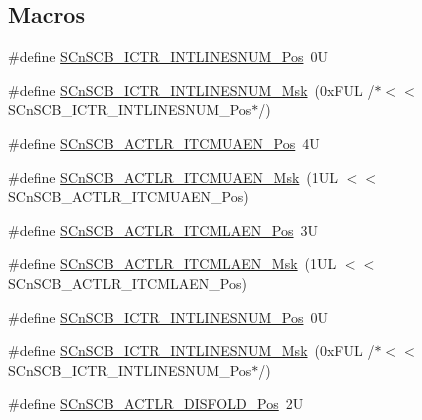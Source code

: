 \subsection*{Macros}
\begin{DoxyCompactItemize}
\item 
\#define \hyperlink{group___c_m_s_i_s___s_cn_s_c_b_ga0777ddf379af50f9ca41d40573bfffc5}{S\+Cn\+S\+C\+B\+\_\+\+I\+C\+T\+R\+\_\+\+I\+N\+T\+L\+I\+N\+E\+S\+N\+U\+M\+\_\+\+Pos}~0U
\item 
\#define \hyperlink{group___c_m_s_i_s___s_cn_s_c_b_ga3efa0f5210051464e1034b19fc7b33c7}{S\+Cn\+S\+C\+B\+\_\+\+I\+C\+T\+R\+\_\+\+I\+N\+T\+L\+I\+N\+E\+S\+N\+U\+M\+\_\+\+Msk}~(0x\+F\+U\+L /$\ast$$<$$<$ S\+Cn\+S\+C\+B\+\_\+\+I\+C\+T\+R\+\_\+\+I\+N\+T\+L\+I\+N\+E\+S\+N\+U\+M\+\_\+\+Pos$\ast$/)
\item 
\#define \hyperlink{group___c_m_s_i_s___s_cn_s_c_b_gae4360bc2810b8486ccf74e7a853e1458}{S\+Cn\+S\+C\+B\+\_\+\+A\+C\+T\+L\+R\+\_\+\+I\+T\+C\+M\+U\+A\+E\+N\+\_\+\+Pos}~4U
\item 
\#define \hyperlink{group___c_m_s_i_s___s_cn_s_c_b_ga034b71340cb2e5455624b715d70cb36b}{S\+Cn\+S\+C\+B\+\_\+\+A\+C\+T\+L\+R\+\_\+\+I\+T\+C\+M\+U\+A\+E\+N\+\_\+\+Msk}~(1\+U\+L $<$$<$ S\+Cn\+S\+C\+B\+\_\+\+A\+C\+T\+L\+R\+\_\+\+I\+T\+C\+M\+U\+A\+E\+N\+\_\+\+Pos)
\item 
\#define \hyperlink{group___c_m_s_i_s___s_cn_s_c_b_gad5d71c0786cdb8a28f322b545d218aa7}{S\+Cn\+S\+C\+B\+\_\+\+A\+C\+T\+L\+R\+\_\+\+I\+T\+C\+M\+L\+A\+E\+N\+\_\+\+Pos}~3U
\item 
\#define \hyperlink{group___c_m_s_i_s___s_cn_s_c_b_ga96ed7dd2124586ddd816973d665d2014}{S\+Cn\+S\+C\+B\+\_\+\+A\+C\+T\+L\+R\+\_\+\+I\+T\+C\+M\+L\+A\+E\+N\+\_\+\+Msk}~(1\+U\+L $<$$<$ S\+Cn\+S\+C\+B\+\_\+\+A\+C\+T\+L\+R\+\_\+\+I\+T\+C\+M\+L\+A\+E\+N\+\_\+\+Pos)
\item 
\#define \hyperlink{group___c_m_s_i_s___s_cn_s_c_b_ga0777ddf379af50f9ca41d40573bfffc5}{S\+Cn\+S\+C\+B\+\_\+\+I\+C\+T\+R\+\_\+\+I\+N\+T\+L\+I\+N\+E\+S\+N\+U\+M\+\_\+\+Pos}~0U
\item 
\#define \hyperlink{group___c_m_s_i_s___s_cn_s_c_b_ga3efa0f5210051464e1034b19fc7b33c7}{S\+Cn\+S\+C\+B\+\_\+\+I\+C\+T\+R\+\_\+\+I\+N\+T\+L\+I\+N\+E\+S\+N\+U\+M\+\_\+\+Msk}~(0x\+F\+U\+L /$\ast$$<$$<$ S\+Cn\+S\+C\+B\+\_\+\+I\+C\+T\+R\+\_\+\+I\+N\+T\+L\+I\+N\+E\+S\+N\+U\+M\+\_\+\+Pos$\ast$/)
\item 
\#define \hyperlink{group___c_m_s_i_s___s_cn_s_c_b_gaab395870643a0bee78906bb15ca5bd02}{S\+Cn\+S\+C\+B\+\_\+\+A\+C\+T\+L\+R\+\_\+\+D\+I\+S\+F\+O\+L\+D\+\_\+\+Pos}~2U

\end{DoxyCompactItemize}

